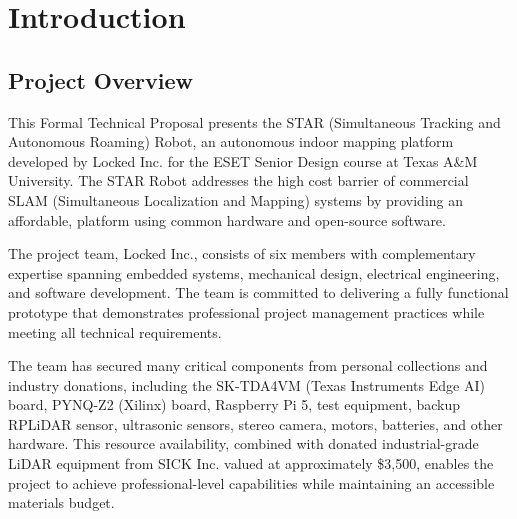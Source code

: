
\section{Introduction}\label{sec:introduction}

\subsection{Project Overview}\label{sec:project-overview}

This Formal Technical Proposal presents the STAR (Simultaneous Tracking and Autonomous Roaming) Robot, an autonomous indoor mapping platform developed by Locked Inc. for the ESET Senior Design course at Texas A\&M University. The STAR Robot addresses the high cost barrier of commercial SLAM (Simultaneous Localization and Mapping) systems by providing an affordable,  platform using common hardware and open-source software.

The project team, Locked Inc., consists of six members with complementary expertise spanning embedded systems, mechanical design, electrical engineering, and software development. The team is committed to delivering a fully functional prototype that demonstrates professional project management practices while meeting all technical requirements.

The team has secured many critical components from personal collections and industry donations, including the SK-TDA4VM (Texas Instruments Edge AI) board, PYNQ-Z2 (Xilinx) board, Raspberry Pi 5, test equipment, backup RPLiDAR sensor, ultrasonic sensors, stereo camera, motors, batteries, and other hardware. This resource availability, combined with donated industrial-grade LiDAR equipment from SICK Inc. valued at approximately \$3,500, enables the project to achieve professional-level capabilities while maintaining an accessible materials budget.

